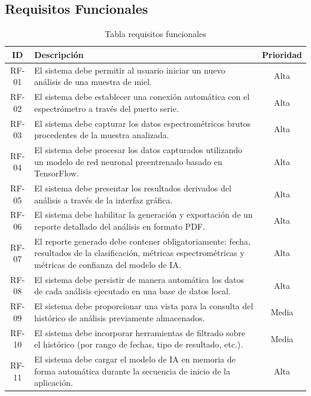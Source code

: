 \subsection{Requisitos Funcionales}
\begin{table}[H]
    \begin{tabular}{|c|p{10cm}|c|}
        \hline
        \textbf{ID} & \textbf{Descripción} & \textbf{Prioridad} \\ \hline
        RF-01 & El sistema debe permitir al usuario iniciar un nuevo análisis de una muestra de miel. & Alta \\ \hline
        RF-02 & El sistema debe establecer una conexión automática con el espectrómetro a través del puerto serie. & Alta \\ \hline
        RF-03 & El sistema debe capturar los datos espectrométricos brutos procedentes de la muestra analizada. & Alta \\ \hline
        RF-04 & El sistema debe procesar los datos capturados utilizando un modelo de red neuronal preentrenado basado en TensorFlow. & Alta \\ \hline
        RF-05 & El sistema debe presentar los resultados derivados del análisis a través de la interfaz gráfica. & Alta \\ \hline
        RF-06 & El sistema debe habilitar la generación y exportación de un reporte detallado del análisis en formato PDF. & Alta \\ \hline
        RF-07 & El reporte generado debe contener obligatoriamente: fecha, resultados de la clasificación, métricas espectrométricas y métricas de confianza del modelo de IA. & Alta \\ \hline
        RF-08 & El sistema debe persistir de manera automática los datos de cada análisis ejecutado en una base de datos local. & Alta \\ \hline
        RF-09 & El sistema debe proporcionar una vista para la consulta del histórico de análisis previamente almacenados. & Media \\ \hline
        RF-10 & El sistema debe incorporar herramientas de filtrado sobre el histórico (por rango de fechas, tipo de resultado, etc.). & Media \\ \hline
        RF-11 & El sistema debe cargar el modelo de IA en memoria de forma automática durante la secuencia de inicio de la aplicación. & Alta \\ \hline
    \end{tabular}
    \caption{Tabla requisitos funcionales}
\end{table}
\newpage

